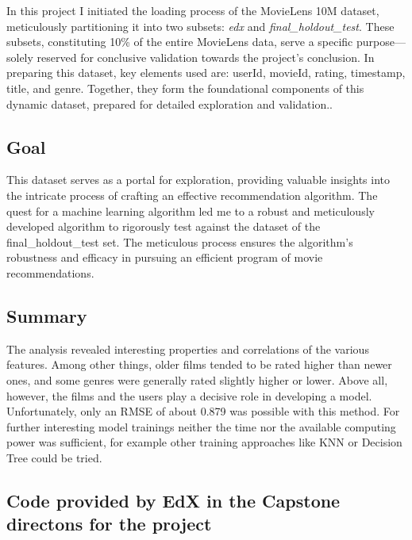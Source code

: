 \documentclass[
]{article}
\begin{document}
In this project I initiated the loading process of the MovieLens 10M
dataset, meticulously partitioning it into two subsets: \emph{edx} and
\emph{final\_holdout\_test}. These subsets, constituting 10\% of the
entire MovieLens data, serve a specific purpose---solely reserved for
conclusive validation towards the project's conclusion. In preparing
this dataset, key elements used are: userId, movieId, rating, timestamp,
title, and genre. Together, they form the foundational components of
this dynamic dataset, prepared for detailed exploration and validation..

\hypertarget{goal}{%
\subsection{Goal}\label{goal}}

This dataset serves as a portal for exploration, providing valuable
insights into the intricate process of crafting an effective
recommendation algorithm. The quest for a machine learning algorithm led
me to a robust and meticulously developed algorithm to rigorously test
against the dataset of the final\_holdout\_test set. The meticulous
process ensures the algorithm's robustness and efficacy in pursuing an
efficient program of movie recommendations.

\hypertarget{summary}{%
\subsection{Summary}\label{summary}}

The analysis revealed interesting properties and correlations of the
various features. Among other things, older films tended to be rated
higher than newer ones, and some genres were generally rated slightly
higher or lower. Above all, however, the films and the users play a
decisive role in developing a model. Unfortunately, only an RMSE of
about 0.879 was possible with this method. For further interesting model
trainings neither the time nor the available computing power was
sufficient, for example other training approaches like KNN or Decision
Tree could be tried.

\newpage

\hypertarget{code-provided-by-edx-in-the-capstone-directons-for-the-project}{%
\subsection{Code provided by EdX in the Capstone directons for the
project}\label{code-provided-by-edx-in-the-capstone-directons-for-the-project}}
\end{document}
